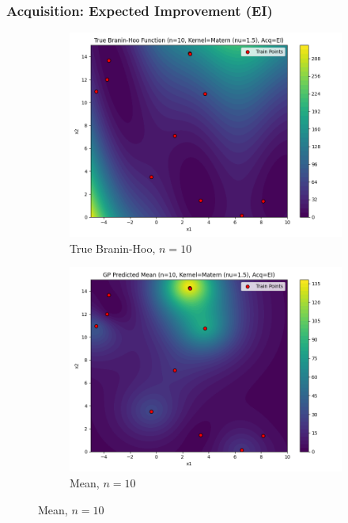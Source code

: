 \documentclass[a4paper,12pt]{article}
\begin{document}
\subsubsection*{Acquisition: Expected Improvement (EI)}
\begin{figure}[H]
\centering
\begin{subfigure}{0.3\textwidth}
  \includegraphics[width=\linewidth]{Task-02/images/true_function_matern_n10_EI.png}
  \caption{True Branin-Hoo, $n=10$}
\end{subfigure}
\begin{subfigure}{0.3\textwidth}
    \includegraphics[width=\linewidth]{Task-02/images/gp_mean_matern_n10_EI.png}
    \caption{Mean, $n=10$}
\end{subfigure}

\end{figure}
\end{document}
